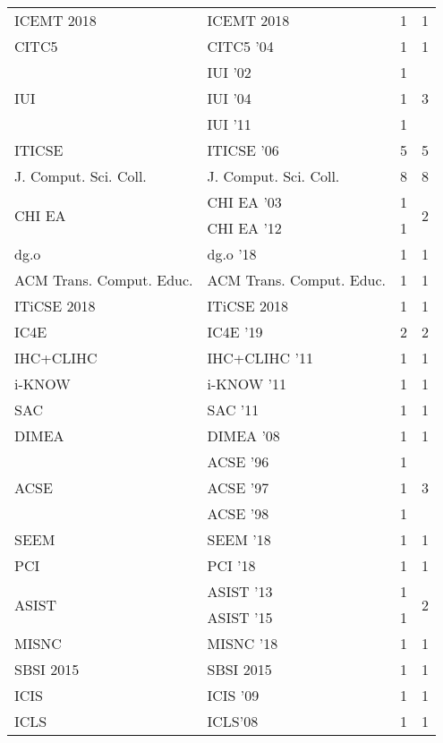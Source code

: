 \begin{table*}[t]
\begin{tabular}{llrr}
\multirow{1}{*}{ICEMT 2018} & ICEMT 2018 & 1 & \multirow{1}{*}{1}\\
\multirow{1}{*}{CITC5 } & CITC5 '04 & 1 & \multirow{1}{*}{1}\\
\multirow{3}{*}{IUI } & IUI '02 & 1 & \multirow{3}{*}{3}\\
& IUI '04 & 1 &\\
& IUI '11 & 1 &\\
\multirow{1}{*}{ITICSE } & ITICSE '06 & 5 & \multirow{1}{*}{5}\\
\multirow{1}{*}{J. Comput. Sci. Coll.} & J. Comput. Sci. Coll. & 8 & \multirow{1}{*}{8}\\
\multirow{2}{*}{CHI EA } & CHI EA '03 & 1 & \multirow{2}{*}{2}\\
& CHI EA '12 & 1 &\\
\multirow{1}{*}{dg.o } & dg.o '18 & 1 & \multirow{1}{*}{1}\\
\multirow{1}{*}{ACM Trans. Comput. Educ.} & ACM Trans. Comput. Educ. & 1 & \multirow{1}{*}{1}\\
\multirow{1}{*}{ITiCSE 2018} & ITiCSE 2018 & 1 & \multirow{1}{*}{1}\\
\multirow{1}{*}{IC4E } & IC4E '19 & 2 & \multirow{1}{*}{2}\\
\multirow{1}{*}{IHC+CLIHC } & IHC+CLIHC '11 & 1 & \multirow{1}{*}{1}\\
\multirow{1}{*}{i-KNOW } & i-KNOW '11 & 1 & \multirow{1}{*}{1}\\
\multirow{1}{*}{SAC } & SAC '11 & 1 & \multirow{1}{*}{1}\\
\multirow{1}{*}{DIMEA } & DIMEA '08 & 1 & \multirow{1}{*}{1}\\
\multirow{3}{*}{ACSE } & ACSE '96 & 1 & \multirow{3}{*}{3}\\
& ACSE '97 & 1 &\\
& ACSE '98 & 1 &\\
\multirow{1}{*}{SEEM } & SEEM '18 & 1 & \multirow{1}{*}{1}\\
\multirow{1}{*}{PCI } & PCI '18 & 1 & \multirow{1}{*}{1}\\
\multirow{2}{*}{ASIST } & ASIST '13 & 1 & \multirow{2}{*}{2}\\
& ASIST '15 & 1 &\\
\multirow{1}{*}{MISNC } & MISNC '18 & 1 & \multirow{1}{*}{1}\\
\multirow{1}{*}{SBSI 2015} & SBSI 2015 & 1 & \multirow{1}{*}{1}\\
\multirow{1}{*}{ICIS } & ICIS '09 & 1 & \multirow{1}{*}{1}\\
\multirow{1}{*}{ICLS} & ICLS'08 & 1 & \multirow{1}{*}{1}\\

\end{tabular}
\end{table*}
